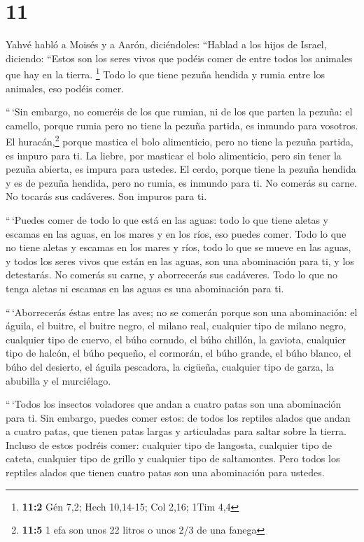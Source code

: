 \hypertarget{section-10}{%
\section{11}\label{section-10}}

 Yahvé habló a Moisés y a Aarón, diciéndoles:
 ``Hablad a los hijos de Israel, diciendo: ``Estos son los
seres vivos que podéis comer de entre todos los animales que hay en la
tierra. \footnote{\textbf{11:2} Gén 7,2; Hech 10,14-15; Col 2,16; 1Tim
  4,4}  Todo lo que tiene pezuña hendida y rumia entre los
animales, eso podéis comer.

 ``\,`Sin embargo, no comeréis de los que rumian, ni de
los que parten la pezuña: el camello, porque rumia pero no tiene la
pezuña partida, es inmundo para vosotros.  El
huracán,\footnote{\textbf{11:5} 1 efa son unos 22 litros o unos 2/3 de
  una fanega} porque mastica el bolo alimenticio, pero no tiene la
pezuña partida, es impuro para ti.  La liebre, por
masticar el bolo alimenticio, pero sin tener la pezuña abierta, es
impura para ustedes.  El cerdo, porque tiene la pezuña
hendida y es de pezuña hendida, pero no rumia, es inmundo para ti.
 No comerás su carne. No tocarás sus cadáveres. Son
impuros para ti.

 ``\,`Puedes comer de todo lo que está en las aguas: todo
lo que tiene aletas y escamas en las aguas, en los mares y en los ríos,
eso puedes comer.  Todo lo que no tiene aletas y escamas
en los mares y ríos, todo lo que se mueve en las aguas, y todos los
seres vivos que están en las aguas, son una abominación para ti,
 y los detestarás. No comerás su carne, y aborrecerás sus
cadáveres.  Todo lo que no tenga aletas ni escamas en las
aguas es una abominación para ti.

 ``\,`Aborrecerás éstas entre las aves; no se comerán
porque son una abominación: el águila, el buitre, el buitre negro,
 el milano real, cualquier tipo de milano negro,
 cualquier tipo de cuervo,  el búho
cornudo, el búho chillón, la gaviota, cualquier tipo de halcón,
 el búho pequeño, el cormorán, el búho grande,
 el búho blanco, el búho del desierto, el águila
pescadora,  la cigüeña, cualquier tipo de garza, la
abubilla y el murciélago.

 ``\,`Todos los insectos voladores que andan a cuatro
patas son una abominación para ti.  Sin embargo, puedes
comer estos: de todos los reptiles alados que andan a cuatro patas, que
tienen patas largas y articuladas para saltar sobre la tierra.
 Incluso de estos podréis comer: cualquier tipo de
langosta, cualquier tipo de cateta, cualquier tipo de grillo y cualquier
tipo de saltamontes.  Pero todos los reptiles alados que
tienen cuatro patas son una abominación para ustedes.

